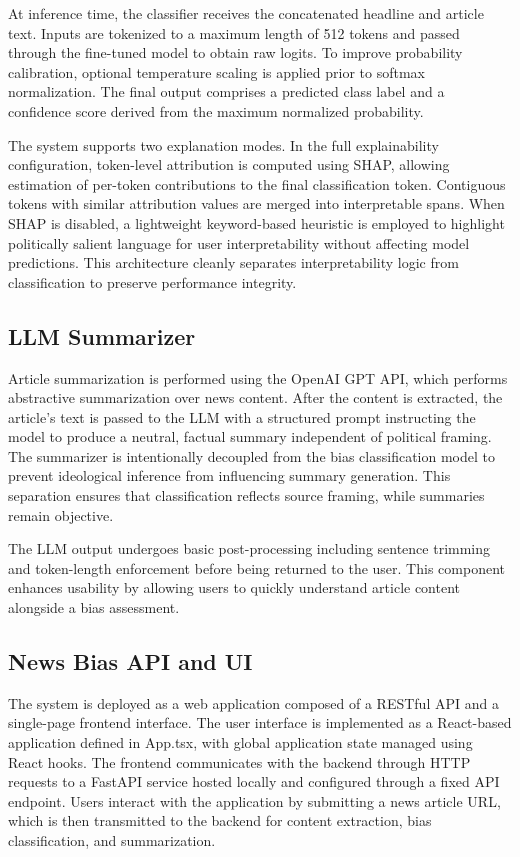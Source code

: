 \documentclass{article}
\begin{document}
At inference time, the classifier receives the concatenated headline and article text. Inputs are tokenized to a maximum length of 512 tokens and passed through the fine-tuned model to obtain raw logits. To improve probability calibration, optional temperature scaling is applied prior to softmax normalization. The final output comprises a predicted class label and a confidence score derived from the maximum normalized probability.

The system supports two explanation modes. In the full explainability configuration, token-level attribution is computed using SHAP, allowing estimation of per-token contributions to the final classification token. Contiguous tokens with similar attribution values are merged into interpretable spans. When SHAP is disabled, a lightweight keyword-based heuristic is employed to highlight politically salient language for user interpretability without affecting model predictions. This architecture cleanly separates interpretability logic from classification to preserve performance integrity.

\subsection{LLM Summarizer}

Article summarization is performed using the OpenAI GPT API, which performs abstractive summarization over news content. After the content is extracted, the article's text is passed to the LLM with a structured prompt instructing the model to produce a neutral, factual summary independent of political framing. The summarizer is intentionally decoupled from the bias classification model to prevent ideological inference from influencing summary generation. This separation ensures that classification reflects source framing, while summaries remain objective.

The LLM output undergoes basic post-processing including sentence trimming and token-length enforcement before being returned to the user. This component enhances usability by allowing users to quickly understand article content alongside a bias assessment.

\subsection{News Bias API and UI}

The system is deployed as a web application composed of a RESTful API and a single-page frontend interface. The user interface is implemented as a React-based application defined in App.tsx, with global application state managed using React hooks. The frontend communicates with the backend through HTTP requests to a FastAPI service hosted locally and configured through a fixed API endpoint. Users interact with the application by submitting a news article URL, which is then transmitted to the backend for content extraction, bias classification, and summarization.
\end{document}
